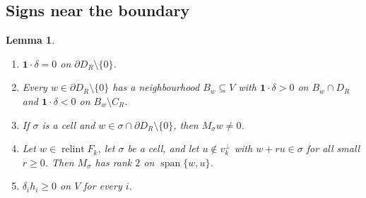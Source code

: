 \documentclass[11pt]{article}
\newcommand{\one}{\mathbf{1}}
\DeclareMathOperator{\relint}{relint}
\DeclareMathOperator{\spn}{span}
\theoremstyle{plain}
\newtheorem{lemma}[theorem]{Lemma}
\theoremstyle{definition}
\theoremstyle{remark}
\begin{document}
\subsection*{Signs near the boundary}

\begin{lemma}\label{lem:PLsigns}
\begin{enumerate}[label=(\roman*)]
  \item $\one\cdot\delta=0$ on $\partial D_R\setminus\{0\}$.
  \item Every $w\in\partial D_R\setminus\{0\}$ has a neighbourhood $B_w\subseteq V$ with
  $\one\cdot\delta>0$ on $B_w\cap D_R$ and $\one\cdot\delta<0$ on $B_w\setminus C_R$.
  \item If $\sigma$ is a cell and $w\in\sigma\cap\partial D_R\setminus\{0\}$, then
  $M_\sigma w\ne0$.
  \item Let $w\in\relint F_k$, let $\sigma$ be a cell, and let $u\notin v_k^\perp$ with
  $w+ru\in\sigma$ for all small $r\ge0$. Then $M_\sigma$ has rank $2$ on $\spn\{w,u\}$.
  \item $\delta_i h_i\ge0$ on $V$ for every $i$.
\end{enumerate}
\end{lemma}
\end{document}
